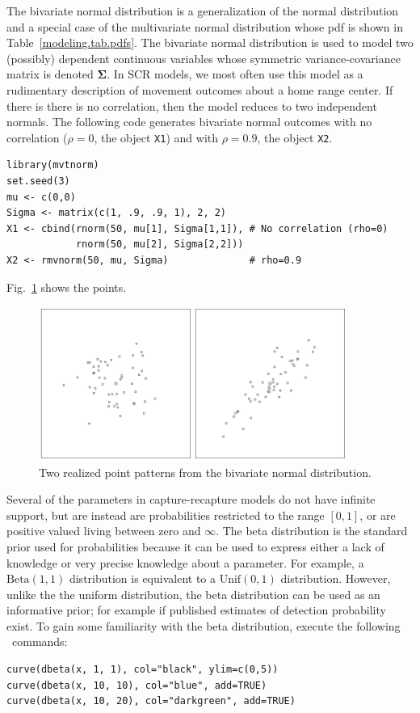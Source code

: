 The bivariate normal distribution is a generalization of the
normal distribution and a special case of the multivariate normal
distribution whose pdf is shown in Table~\ref{modeling.tab.pdfs}. The
bivariate normal distribution is used to model two (possibly) dependent
continuous variables whose symmetric variance-covariance matrix is
denoted $\bm{\Sigma}$.
In SCR models, we most often use this model as
a rudimentary description of movement outcomes about a home range
center. If there is there is no correlation, then the model reduces to
two independent normals. The following code generates bivariate normal
outcomes with no correlation ($\rho=0$, the object \verb+X1+) and with
$\rho=0.9$, the object \verb+X2+.
\begin{verbatim}
library(mvtnorm)
set.seed(3)
mu <- c(0,0)
Sigma <- matrix(c(1, .9, .9, 1), 2, 2)
X1 <- cbind(rnorm(50, mu[1], Sigma[1,1]), # No correlation (rho=0)
            rnorm(50, mu[2], Sigma[2,2]))
X2 <- rmvnorm(50, mu, Sigma)              # rho=0.9
\end{verbatim}
Fig.~\ref{modeling.fig.bvn} shows the points.
\begin{figure}
  \centering
  \includegraphics[width=0.9\textwidth]{Ch1b/figs/bvn}
  \caption{Two realized point patterns from the bivariate normal distribution. }
  \label{modeling.fig.bvn}
\end{figure}

Several of the parameters in capture-recapture models do not have
infinite support, but are instead are
probabilities restricted to the range $[0,1]$, or are positive valued
living between zero and $\infty$. The beta distribution is the
standard prior used for probabilities because it can be used to express either a
lack of knowledge or very precise knowledge about a
parameter. For example, a $\text{Beta}(1,1)$ distribution is
equivalent to a $\text{Unif}(0, 1)$ distribution. However, unlike the
the uniform distribution, the beta distribution can be used as an
informative prior; for example if published estimates of detection
probability exist. To gain some familiarity with the beta
distribution, execute the following \R~commands:
\begin{verbatim}
curve(dbeta(x, 1, 1), col="black", ylim=c(0,5))
curve(dbeta(x, 10, 10), col="blue", add=TRUE)
curve(dbeta(x, 10, 20), col="darkgreen", add=TRUE)
\end{verbatim}

